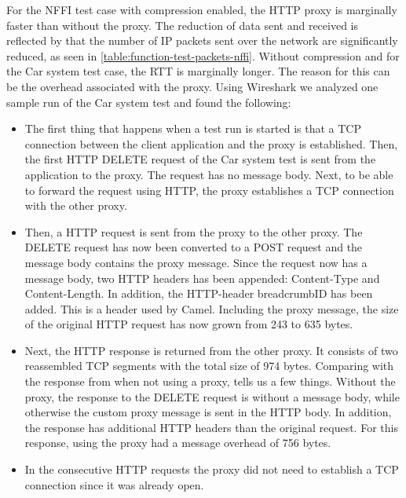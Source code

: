 For the NFFI test case with compression enabled, the HTTP proxy is marginally
faster than without the proxy. The reduction of data sent and received is
reflected by that the number of IP packets sent over the network are
significantly reduced, as seen in \cref{table:function-test-packets-nffi}.
Without compression and for the Car system test case, the RTT is marginally
longer. The reason for this can be the overhead associated with the proxy. Using
Wireshark we analyzed one sample run of the Car system test and found the
following:

\begin{itemize}

	\item The first thing that happens when a test run is started is that a TCP
	connection between the client application and the proxy is established. Then,
	the first HTTP DELETE request of the Car system test is sent from the
	application to the proxy. The request has no message body. Next, to be able to
	forward the request using HTTP, the proxy establishes a TCP connection with the
	other proxy.

	\item Then, a HTTP request is sent from the proxy to the other proxy. The
	DELETE request has now been converted to a POST request and the message
	body contains the proxy message. Since the request now has a message body,
	two HTTP headers has been appended: Content-Type and Content-Length. In
	addition, the HTTP-header breadcrumbID has been added. This is a header used
	by Camel. Including the proxy message, the size of the original HTTP request
	has now grown from 243 to 635 bytes.

	\item Next, the HTTP response is returned from the other proxy. It consists of two
	reassembled TCP segments with the total size of 974  bytes. Comparing with the
	response from when not using a proxy, tells us a few things. Without the proxy,
	the response to the DELETE request is without a message body, while otherwise
	the custom proxy message is sent in the HTTP body. In addition, the response
	has additional HTTP headers than the original request. For this response, using
	the proxy had a message overhead of 756 bytes.

    \item In the consecutive HTTP requests the proxy did not need to establish a
    TCP connection since it was already open.

  \end{itemize}

